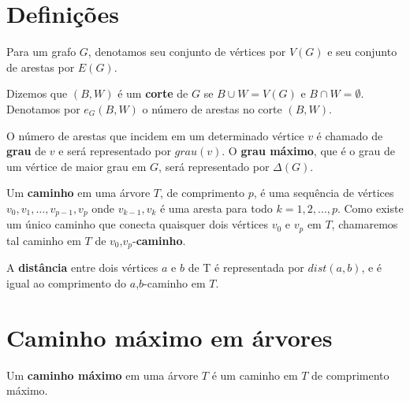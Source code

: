 \documentclass[a4paper,12pt]{article}
\begin{document}
\newpage


\section{Definições}
		
	Para um grafo $G$, denotamos seu
	conjunto de vértices por $V(G)$ e seu
	conjunto de arestas por $E(G)$.

	\bigskip

	Dizemos que $(B,W)$ é um 
	\textbf{corte}
	de $G$ se $B \cup W = V(G)$ e $B \cap W = \emptyset$.
	Denotamos por $e_G(B,W)$ o número de arestas no corte $(B,W)$.

	\bigskip

	O número de arestas que incidem em um determinado
	vértice $v$ é chamado de 
	\textbf{grau} de $v$ e será representado
	por $grau(v)$. O 
	\textbf{grau máximo}, que é o grau de um vértice de
	maior grau em $G$, será representado por $\Delta(G)$.

	\bigskip

	Um \textbf{caminho} em uma árvore $T$, de 
	comprimento $p$, é uma sequência de vértices 
	$v_0, v_1, \ldots,v_{p-1}, v_p$ 
	onde {$v_{k-1}, v_k$} é uma aresta para todo 
	$k = 1,2, \ldots, p$. 
	Como existe um único caminho que conecta quaisquer dois 
	vértices $v_0$ e $v_p$ em $T$, chamaremos tal 
	caminho em $T$ de  
	$v_0$,$v_p$-\textbf{caminho}.

	\bigskip

	A \textbf{distância} entre dois vértices $a$ e 
	$b$ de T é representada por 
	$dist(a,b)$, e é igual ao comprimento do
	$a$,$b$-caminho em $T$.

		

\newpage



\section{Caminho máximo em árvores}

	Um \textbf{caminho máximo} em uma árvore $T$ é um caminho em 
	$T$ de comprimento máximo.
\end{document}
